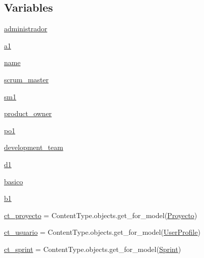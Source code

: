 \subsection*{Variables}
\begin{DoxyCompactItemize}
\item 
\hyperlink{namespace_gestor_proyectos_1_1views_a7c4f590daee33e8a960d99b904dd4a96}{administrador}
\item 
\hyperlink{namespace_gestor_proyectos_1_1views_a6ed4d1f93d4bb9889e969822bb0b3be0}{a1}
\item 
\hyperlink{namespace_gestor_proyectos_1_1views_a5a9c2cbc28edaac706cb0215580a4fe5}{name}
\item 
\hyperlink{namespace_gestor_proyectos_1_1views_a9501b7c365d51492541688d20e7d8606}{scrum\+\_\+master}
\item 
\hyperlink{namespace_gestor_proyectos_1_1views_ae2f936dc5e0da0aea0e04da7daf72971}{sm1}
\item 
\hyperlink{namespace_gestor_proyectos_1_1views_af053fb672be58c4e3935d45fb8e565fc}{product\+\_\+owner}
\item 
\hyperlink{namespace_gestor_proyectos_1_1views_a21ffdec4b01c194667053d33cc5c69e2}{po1}
\item 
\hyperlink{namespace_gestor_proyectos_1_1views_a5afcb612c55740420069dda80959ff88}{development\+\_\+team}
\item 
\hyperlink{namespace_gestor_proyectos_1_1views_aa9cc23100ae24757e535aee968525f32}{d1}
\item 
\hyperlink{namespace_gestor_proyectos_1_1views_a94f792d3d392f6d3d158853d4446812c}{basico}
\item 
\hyperlink{namespace_gestor_proyectos_1_1views_a8d142097795d217c05e793c1df8124a3}{b1}
\item 
\hyperlink{namespace_gestor_proyectos_1_1views_af508953d6cab04a66a55b64c9e0022a8}{ct\+\_\+proyecto} = Content\+Type.\+objects.\+get\+\_\+for\+\_\+model(\hyperlink{classproyectos_1_1models_1_1_proyecto}{Proyecto})
\item 
\hyperlink{namespace_gestor_proyectos_1_1views_a14755a3f8b4bed329a33177f8ba8ccbd}{ct\+\_\+usuario} = Content\+Type.\+objects.\+get\+\_\+for\+\_\+model(\hyperlink{classusuario_1_1models_1_1_user_profile}{User\+Profile})
\item 
\hyperlink{namespace_gestor_proyectos_1_1views_a438baac3ef8df3babde463cbefa88937}{ct\+\_\+sprint} = Content\+Type.\+objects.\+get\+\_\+for\+\_\+model(\hyperlink{class_sprints_1_1models_1_1_sprint}{Sprint})
\item 

\end{DoxyCompactItemize}

